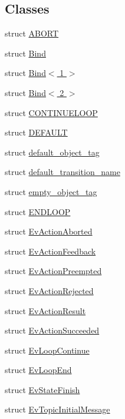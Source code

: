 \subsection*{Classes}
\begin{DoxyCompactItemize}
\item 
struct \hyperlink{structsmacc_1_1ABORT}{A\+B\+O\+RT}
\item 
struct \hyperlink{structsmacc_1_1Bind}{Bind}
\item 
struct \hyperlink{structsmacc_1_1Bind_3_011_01_4}{Bind$<$ 1 $>$}
\item 
struct \hyperlink{structsmacc_1_1Bind_3_012_01_4}{Bind$<$ 2 $>$}
\item 
struct \hyperlink{structsmacc_1_1CONTINUELOOP}{C\+O\+N\+T\+I\+N\+U\+E\+L\+O\+OP}
\item 
struct \hyperlink{structsmacc_1_1DEFAULT}{D\+E\+F\+A\+U\+LT}
\item 
struct \hyperlink{structsmacc_1_1default__object__tag}{default\+\_\+object\+\_\+tag}
\item 
struct \hyperlink{structsmacc_1_1default__transition__name}{default\+\_\+transition\+\_\+name}
\item 
struct \hyperlink{structsmacc_1_1empty__object__tag}{empty\+\_\+object\+\_\+tag}
\item 
struct \hyperlink{structsmacc_1_1ENDLOOP}{E\+N\+D\+L\+O\+OP}
\item 
struct \hyperlink{structsmacc_1_1EvActionAborted}{Ev\+Action\+Aborted}
\item 
struct \hyperlink{structsmacc_1_1EvActionFeedback}{Ev\+Action\+Feedback}
\item 
struct \hyperlink{structsmacc_1_1EvActionPreempted}{Ev\+Action\+Preempted}
\item 
struct \hyperlink{structsmacc_1_1EvActionRejected}{Ev\+Action\+Rejected}
\item 
struct \hyperlink{structsmacc_1_1EvActionResult}{Ev\+Action\+Result}
\item 
struct \hyperlink{structsmacc_1_1EvActionSucceeded}{Ev\+Action\+Succeeded}
\item 
struct \hyperlink{structsmacc_1_1EvLoopContinue}{Ev\+Loop\+Continue}
\item 
struct \hyperlink{structsmacc_1_1EvLoopEnd}{Ev\+Loop\+End}
\item 
struct \hyperlink{structsmacc_1_1EvStateFinish}{Ev\+State\+Finish}
\item 
struct \hyperlink{structsmacc_1_1EvTopicInitialMessage}{Ev\+Topic\+Initial\+Message}
\item 

\end{DoxyCompactItemize}
